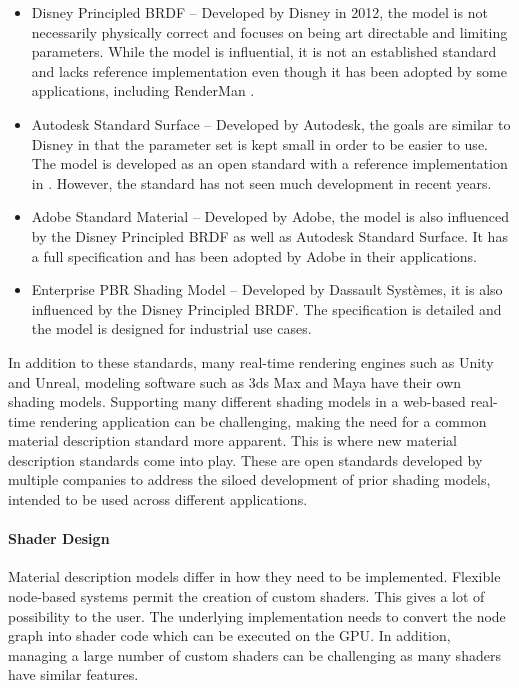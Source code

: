 \begin{itemize}
    \item{Disney Principled BRDF} \cite{disney2012pbr} – Developed by Disney in 2012, the model is not necessarily physically correct and focuses on being art directable and limiting parameters. While the model is influential, it is not an established standard and lacks reference implementation even though it has been adopted by some applications, including \gls{RenderMan} \cite{renderManDisneyPbrDocs}.
    \item{Autodesk Standard Surface} \cite{autodeskStandardSurface} – Developed by Autodesk, the goals are similar to Disney in that the parameter set is kept small in order to be easier to use. The model is developed as an open standard with a reference implementation in . However, the standard has not seen much development in recent years.
    \item{Adobe Standard Material} \cite{adobeStandardMaterial} – Developed by Adobe, the model is also influenced by the Disney Principled BRDF as well as Autodesk Standard Surface. It has a full specification and has been adopted by Adobe in their applications.
    \item {Enterprise PBR Shading Model} \cite{dspbrModel} – Developed by Dassault Systèmes, it is also influenced by the Disney Principled BRDF. The specification is detailed and the model is designed for industrial use cases.
\end{itemize}

In addition to these standards, many real-time rendering engines such as Unity and Unreal, modeling software such as 3ds Max and Maya have their own shading models. Supporting many different shading models in a web-based real-time rendering application can be challenging, making the need for a common material description standard more apparent. This is where new material description standards come into play. These are open standards developed by multiple companies to address the siloed development of prior shading models, intended to be used across different applications.

\paragraph{Shader Design}

Material description models differ in how they need to be implemented. Flexible node-based systems permit the creation of custom shaders. This gives a lot of possibility to the user. The underlying implementation needs to convert the node graph into shader code which can be executed on the \gls{GPU}. In addition, managing a large number of custom shaders can be challenging as many shaders have similar features.

